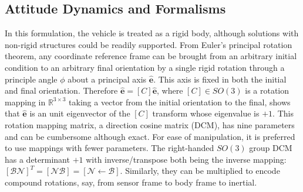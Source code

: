 \documentclass[conf]{new-aiaa}
\begin{document}
\subsection{Attitude Dynamics and Formalisms}
In this formulation, the vehicle is treated as a rigid body, although solutions with non-rigid structures could be readily supported. From Euler's principal rotation theorem,  any coordinate reference frame can be brought from an arbitrary initial condition to an arbitrary final orientation by a single rigid rotation through a principle angle $\phi$ about a principal axis $\hat{\bm{e}}$. This axis is fixed in both the initial and final orientation. Therefore $\hat{\bm{e}} = [C]\hat{\bm{e}}$, where $[C]\in SO(3)$ is a rotation mapping in $\mathbb{R}^{3\times3}$ taking a vector from the initial orientation to the final, shows that $\hat{\bm{e}}$ is an unit eigenvector of the $[C]$ transform whose eigenvalue is $+1$. This rotation mapping matrix, a direction cosine matrix (DCM), has nine parameters and can be cumbersome although exact. For ease of manipulation, it is preferred to use mappings with fewer parameters. The right-handed $SO(3)$ group DCM has a determinant $+1$ with inverse/transpose both being the inverse mapping: $[\mathcal{B}\mathcal{N}]^T = [\mathcal{N}\mathcal{B}] = [\mathcal{N} \leftarrow \mathcal{B}]$. Similarly, they can be multiplied to encode compound rotations, say, from sensor frame to body frame to inertial.
\end{document}
